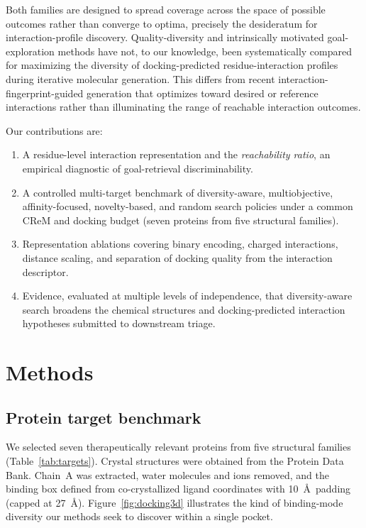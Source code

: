 \documentclass[journal=jcisd8,manuscript=article]{achemso}
\begin{document}
Both families are designed to spread coverage across the space of possible outcomes rather than converge to optima, precisely the desideratum for interaction-profile discovery. Quality-diversity and intrinsically motivated goal-exploration methods have not, to our knowledge, been systematically compared for maximizing the diversity of docking-predicted residue-interaction profiles during iterative molecular generation. This differs from recent interaction-fingerprint-guided generation that optimizes toward desired or reference interactions rather than illuminating the range of reachable interaction outcomes.\cite{wang2026ifpgen}

Our contributions are:
\begin{enumerate}
    \item A residue-level interaction representation and the \emph{reachability ratio}, an empirical diagnostic of goal-retrieval discriminability.
    \item A controlled multi-target benchmark of diversity-aware, multiobjective, affinity-focused, novelty-based, and random search policies under a common CReM and docking budget (seven proteins from five structural families).
    \item Representation ablations covering binary encoding, charged interactions, distance scaling, and separation of docking quality from the interaction descriptor.
    \item Evidence, evaluated at multiple levels of independence, that diversity-aware search broadens the chemical structures and docking-predicted interaction hypotheses submitted to downstream triage.
\end{enumerate}


\section{Methods}

\subsection{Protein target benchmark}

We selected seven therapeutically relevant proteins from five structural families (Table~\ref{tab:targets}). Crystal structures were obtained from the Protein Data Bank.\cite{berman2000protein} Chain~A was extracted, water molecules and ions removed, and the binding box defined from co-crystallized ligand coordinates with 10~\AA\ padding (capped at 27~\AA). Figure~\ref{fig:docking3d} illustrates the kind of binding-mode diversity our methods seek to discover within a single pocket.
\end{document}
